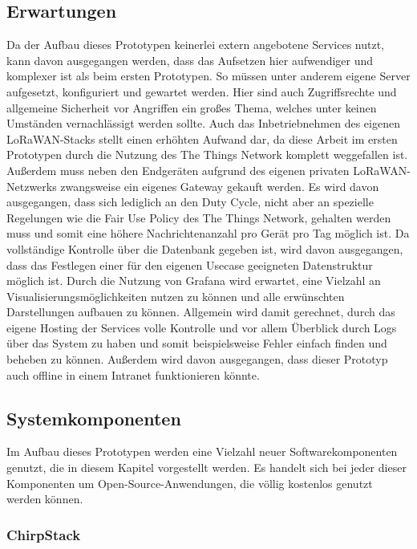 \subsection{Erwartungen}
\label{sec:Prot:erwartungen2}

Da der Aufbau dieses Prototypen keinerlei extern angebotene Services nutzt, kann davon ausgegangen werden, dass das Aufsetzen hier aufwendiger und komplexer ist als beim ersten Prototypen. So müssen unter anderem eigene Server aufgesetzt, konfiguriert und gewartet werden. Hier sind auch Zugriffsrechte und allgemeine Sicherheit vor Angriffen ein großes Thema, welches unter keinen Umständen vernachlässigt werden sollte. Auch das Inbetriebnehmen des eigenen LoRaWAN-Stacks stellt einen erhöhten Aufwand dar, da diese Arbeit im ersten Prototypen durch die Nutzung des The Things Network komplett weggefallen ist. Außerdem muss neben den Endgeräten aufgrund des eigenen privaten LoRaWAN-Netzwerks zwangsweise ein eigenes Gateway gekauft werden. Es wird davon ausgegangen, dass sich lediglich an den Duty Cycle, nicht aber an spezielle Regelungen wie die Fair Use Policy des The Things Network, gehalten werden muss und somit eine höhere Nachrichtenanzahl pro Gerät pro Tag möglich ist. Da vollständige Kontrolle über die Datenbank gegeben ist, wird davon ausgegangen, dass das Festlegen einer für den eigenen Usecase geeigneten Datenstruktur möglich ist. Durch die Nutzung von Grafana wird erwartet, eine Vielzahl an Visualisierungsmöglichkeiten nutzen zu können und alle erwünschten Darstellungen aufbauen zu können. Allgemein wird damit gerechnet, durch das eigene Hosting der Services volle Kontrolle und vor allem Überblick durch Logs über das System zu haben und somit beispielsweise Fehler einfach finden und beheben zu können. Außerdem wird davon ausgegangen, dass dieser Prototyp auch offline in einem Intranet funktionieren könnte.

\subsection{Systemkomponenten}
\label{sec:Prot:systemkomponenten2}

Im Aufbau dieses Prototypen werden eine Vielzahl neuer Softwarekomponenten genutzt, die in diesem Kapitel vorgestellt werden. Es handelt sich bei jeder dieser Komponenten um Open-Source-Anwendungen, die völlig kostenlos genutzt werden können.

\subsubsection{ChirpStack} %

